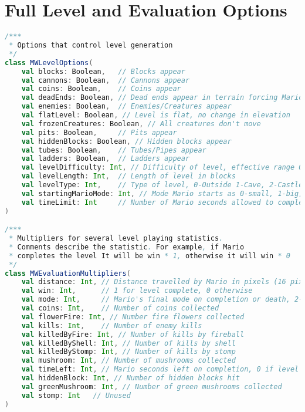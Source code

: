 \section{Full Level and Evaluation Options}
\label{app:loem}
\setcounter{lstlisting}{0}

\begin{minipage}{0.9\linewidth}
\begin{lstlisting}[language=scala, basicstyle=\scriptsize\ttfamily, caption={Full field definitions for MW\-Level\-Options and MW\-Evaluation\-Multipliers described in Section \ref{subsec:paramclasses}}]
/***
 * Options that control level generation
 */
class MWLevelOptions(
    val blocks: Boolean,   // Blocks appear
    val cannons: Boolean,  // Cannons appear
    val coins: Boolean,    // Coins appear
    val deadEnds: Boolean, // Dead ends appear in terrain forcing Mario to turn back
    val enemies: Boolean,  // Enemies/Creatures appear
    val flatLevel: Boolean, // Level is flat, no change in elevation
    val frozenCreatures: Boolean, // All creatures don't move
    val pits: Boolean,     // Pits appear
    val hiddenBlocks: Boolean, // Hidden blocks appear
    val tubes: Boolean,    // Tubes/Pipes appear
    val ladders: Boolean,  // Ladders appear
    val levelDifficulty: Int, // Difficulty of level, effective range 0-25, 0 easiest
    val levelLength: Int,  // Length of level in blocks
    val levelType: Int,    // Type of level, 0-Outside 1-Cave, 2-Castle
    val startingMarioMode: Int, // Mode Mario starts as 0-small, 1-big, 2-fire
    val timeLimit: Int     // Number of Mario seconds allowed to complete level
)

/***
 * Multipliers for several level playing statistics.
 * Comments describe the statistic. For example, if Mario
 * completes the level It will be win * 1, otherwise it will win * 0
 */
class MWEvaluationMultipliers(
    val distance: Int, // Distance travelled by Mario in pixels (16 pixels to a block)
    val win: Int,      // 1 for level complete, 0 otherwise
    val mode: Int,     // Mario's final mode on completion or death, 2-fire, 1-big, 0-small
    val coins: Int,    // Number of coins collected
    val flowerFire: Int, // Number fire flowers collected
    val kills: Int,    // Number of enemy kills
    val killedByFire: Int, // Number of kills by fireball
    val killedByShell: Int, // Number of kills by shell
    val killedByStomp: Int, // Number of kills by stomp
    val mushroom: Int, // Number of mushrooms collected
    val timeLeft: Int, // Mario seconds left on completion, 0 if level not completed
    val hiddenBlock: Int, // Number of hidden blocks hit
    val greenMushroom: Int, // Number of green mushrooms collected
    val stomp: Int   // Unused
)
\end{lstlisting}
\end{minipage}

